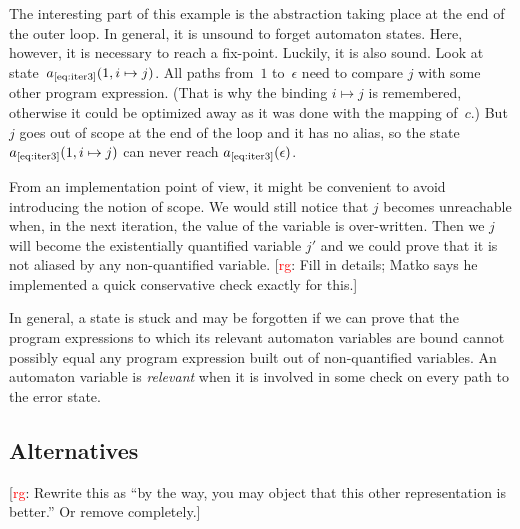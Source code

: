 \documentclass[a4paper]{article}
\newcommand{\rg}[1]{\todo{rg}{#1}}
\newcommand{\todo}[2]{{\small [\textcolor{red}{#1}: #2]}}
\theoremstyle{slanted}
\theoremstyle{definition}
\theoremstyle{remark}
\begin{document}
The interesting part of this example is the abstraction taking place at the end of the outer loop.
In general, it is unsound to forget automaton states.
Here, however, it is necessary to reach a fix-point.
Luckily, it is also sound.
Look at state~$a_\text{\ref{eq:iter3}}(1, i\mapsto j)$.
All paths from~$1$ to~$\epsilon$ need to compare $j$ with some other program expression.
(That is why the binding $i\mapsto j$ is remembered, otherwise it could be optimized away as it was done with the mapping of~$c$.)
But $j$ goes out of scope at the end of the loop and it has no alias, so the state~$a_\text{\ref{eq:iter3}}(1, i\mapsto j)$ can never reach $a_\text{\ref{eq:iter3}}(\epsilon)$.

From an implementation point of view, it might be convenient to avoid introducing the notion of scope.
We would still notice that $j$ becomes unreachable when, in the next iteration, the value of the variable is over-written.
Then we $j$ will become the existentially quantified variable $j'$ and we could prove that it is not aliased by any non-quantified variable.
\rg{Fill in details; Matko says he implemented a quick conservative check exactly for this.}

In general, a state is stuck and may be forgotten if we can prove that the program expressions to which its relevant automaton variables are bound cannot possibly equal any program expression built out of non-quantified variables. An automaton variable is \emph{relevant} when it is involved in some check on every path to the error state.


\subsection{Alternatives}

\rg{Rewrite this as ``by the way, you may object that this other representation
is better.'' Or remove completely.}
\end{document}
